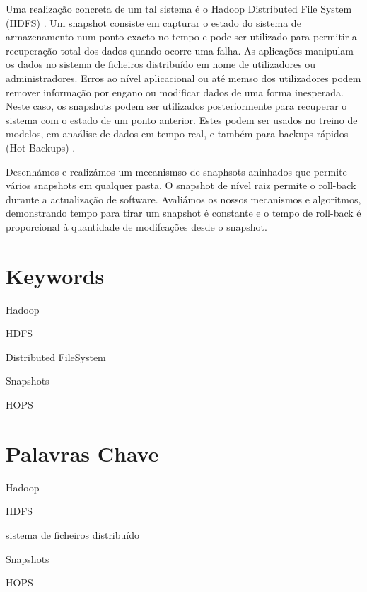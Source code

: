 Uma realização concreta de um tal sistema é o Hadoop Distributed File System  (HDFS) . Um snapshot consiste em capturar o estado do sistema de armazenamento num ponto exacto no tempo e pode ser utilizado para permitir a recuperação total dos dados quando ocorre uma falha. As aplicações manipulam os dados no sistema de ficheiros distribuído em nome de utilizadores ou administradores. Erros ao nível aplicacional ou até memso dos utilizadores podem remover informação por engano ou modificar dados de uma forma inesperada. Neste caso, os snapshots podem ser utilizados posteriormente para recuperar o sistema com o estado de um ponto anterior. Estes podem ser usados no treino de modelos, em anaálise de dados em tempo real, e também para backups rápidos  (Hot Backups) .

Desenhámos e realizámos um mecanismso de snaphsots aninhados que permite vários snapshots em qualquer pasta. O snapshot de nível raiz permite o roll-back durante a actualização de software. Avaliámos os nossos mecanismos e algoritmos, demonstrando tempo para tirar um snapshot é constante e o tempo de roll-back é proporcional à quantidade de modifcações desde o snapshot.



\newpage




\section*{Keywords}

{\large %

\noindent Hadoop

\noindent HDFS

\noindent Distributed FileSystem

\noindent Snapshots

\noindent HOPS

}

\section*{Palavras Chave}

{\large %

\noindent Hadoop

\noindent HDFS

\noindent sistema de ficheiros distribuído

\noindent Snapshots

\noindent HOPS

}


